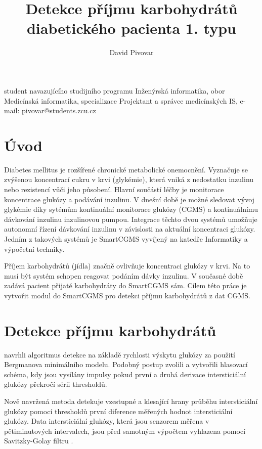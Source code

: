 \documentclass{template_svk}
\begin{document}
\title{Detekce příjmu karbohydrátů diabetického pacienta 1. typu}

 \author{David Pivovar}{student navazujícího studijního programu Inženýrská informatika, obor Medicínská informatika, specializace Projektant a správce medicínských IS, e-mail: pivovar@students.zcu.cz}

\maketitle

\section{Úvod}

Diabetes mellitus je rozšířené chronické metabolické onemocnění. Vyznačuje se zvýšenou koncentrací cukru v krvi (glykémie), která vniká z nedostatku inzulinu nebo rezistencí vůči jeho působení. Hlavní součástí léčby je monitorace koncentrace glukózy a podávání inzulinu. V dnešní době je možné sledovat vývoj glykémie díky sytémům kontinuální monitorace glukózy (CGMS) a kontinuálnímu dávkování inzulinu inzulinovou pumpou. Integrace těchto dvou systémů umožňuje autonomní řízení dávkování inzulinu v závislosti na aktuální koncentraci glukózy. Jedním z takových systémů je SmartCGMS \citep{smartcgms} vyvíjený na katedře Informatiky a výpočetní techniky.

Příjem karbohydrátů (jídla) značně ovlivňuje koncentraci glukózy v krvi. Na to musí být systém schopen reagovat podáním dávky inzulinu. V současné době zadává pacient přijaté karbohydráty do SmartCGMS sám. Cílem této práce je vytvořit modul do SmartCGMS pro detekci příjmu karbohydrátů z dat CGMS.

\section{Detekce příjmu karbohydrátů}

\cite{turksoy} navrhli algoritmus detekce na základě rychlosti výskytu glukózy za použití Bergmanova minimálního modelu. Podobný postup zvolili \cite{hyunjin} a vytvořili hlasovací schéma, kdy jsou vysílány impulsy pokud první a druhá derivace intersticiální glukózy překročí sérii thresholdů.

Nově navržená metoda detekuje vzestupné a klesající hrany průběhu intersticiální glukózy pomocí thresholdů první diference měřených hodnot intersticiální glukózy. Data intersticiální glukózy, která jsou senzorem měřena v pětiminutových intervalech, jsou před samotným výpočtem vyhlazena pomocí Savitzky-Golay filtru \citep{savgol}.
\end{document}
